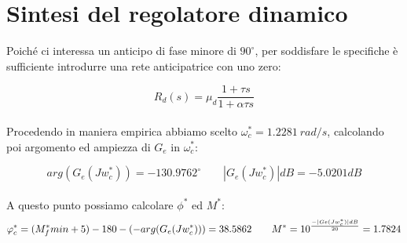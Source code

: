\documentclass[a4paper,12pt,italian]{article}
\begin{document}
\section*{Sintesi del regolatore dinamico}

Poiché ci interessa un anticipo di fase minore di $90^\circ$, 
per soddisfare le specifiche è sufficiente introdurre una rete anticipatrice con uno zero:

\begin{equation*}
    R_d(s)= \mu_d \frac{1+\tau s} { 1 + \alpha \tau s} 
\end{equation*}\\
Procedendo in maniera empirica abbiamo scelto $\omega_c^* = 1.2281~rad/s$, calcolando poi argomento ed ampiezza di $G_e$ in $\omega_c^*$:

\begin{equation*}
        arg(G_e(J w^*_c))= -130.9762^\circ
        \hspace{2em}|G_e(J w^*_c)|dB = -5.0201 dB
\end{equation*}\\
A questo punto possiamo calcolare $\phi^*$ ed $M^*$:
\begin{equation*}
    \varphi^*_c=(M^*_fmin +5)-180-(\space-arg(G_e(J w^*_c))\space)=38.5862
    \hspace{2em}M^*=10^\frac{-|Ge(Jw_c^*)|dB}{20}=1.7824
\end{equation*}
\end{document}
